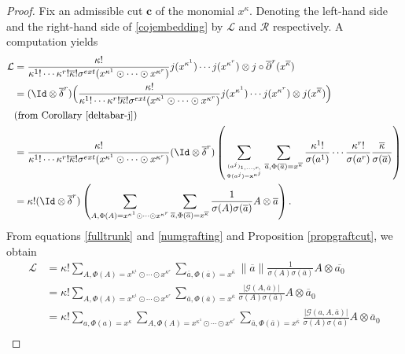 \documentclass[a4paper,11pt]{article}
\begin{document}
\begin{proof}
Fix an admissible cut $\mathbf c$ of the monomial $x^{\kappa}$. Denoting the left-hand side and the right-hand side of \eqref{cojembedding} by $\mathcal L$ and $\mathcal R$ respectively.
A computation yields
\begin{align*}
\mathcal L & = \frac{\kappa!}{\kappa^1!\cdots \kappa^r!\overline{\kappa}!\sigma^{ext}(x^{\kappa^1}\odot \cdots\odot x^{\kappa^r})}j(x^{\kappa^1})\cdots j(x^{\kappa^r})\otimes j\circ \overline{\partial}^r(x^{\overline{\kappa}})\\
& = (\Id \otimes \overline{\delta}^r)\Big(\frac{\kappa!}{\kappa^1!\cdots \kappa^r!\overline{\kappa}!\sigma^{ext}(x^{\kappa^1} \odot \cdots\odot x^{\kappa^r})}j(x^{\kappa^1})\cdots j(x^{\kappa^r})\otimes j(x^{\overline{\kappa}})\Big)  \\
& (\text{from Corollary } \ref{deltabar-j})\\
& = \frac{\kappa!}{\kappa^1!\cdots \kappa^r!\overline{\kappa}!\sigma^{ext}(x^{\kappa^1}\odot\cdots\odot x^{\kappa^r})}(\Id \otimes \overline{\delta}^r)\left(\sum_{ \genfrac{}{}{0pt}{2}{(a^j)_{1,\ldots, r,}}  {\Phi(a^j)=\mathbf x^{\mathbf \kappa^j} }}\sum_{\overline{a}, \Phi(\overline{a})=x^{\overline{\kappa}}}\frac{\kappa^1!}{\sigma(a^1)} \cdots \frac{\kappa^r!}{\sigma(a^r)}\frac{\overline{\kappa}}{\sigma(\overline{a})}\right)\\
& =  \kappa!(\Id \otimes \overline{\delta}^r)\left(\sum_{A, \Phi(A)= x^{\kappa^1}\odot \cdots\odot x^{\kappa^r}}\sum_{\overline{a}, \Phi(\overline{a})=x^{\overline{\kappa}}}\frac{1}{\sigma(A)\sigma(\overline{a})}A\otimes \overline{a}\right).
\end{align*}
From equations \eqref{fulltrunk} and \eqref{numgrafting} and Proposition \ref{propgraftcut}, we obtain 
\begin{align*}
\mathcal L & = \kappa! \sum_{A, \Phi(A)=x^{\kappa^1}\odot \cdots\odot  x^{\kappa^r}}\sum_{\overline{a}, \Phi(\overline{a})=x^{\overline{\kappa}}}\| \overline{a}\|\frac{1}{\sigma(A)\sigma(\overline{a})}A\otimes \overline{a_0}\\
& = \kappa! \sum_{A, \Phi(A)= x^{\kappa^1}\odot \cdots\odot x^{\kappa^r}}\sum_{\overline{a}, \Phi(\overline{a})=x^{\overline{\kappa}}}\frac{\vert\mathcal G(A, \overline{a})\vert}{\sigma(A)\sigma(\overline{a})}A\otimes \overline{a}_0\\
& = \kappa! \sum_{a, \Phi(a)=x^{\kappa}}\sum_{A, \Phi(A)=x^{\kappa^1}\odot \cdots\odot x^{\kappa^r}}\sum_{\overline{a}, \Phi(\overline{a})=x^{\overline{\kappa}}}\frac{\vert \mathcal G(a, A, \overline{a})\vert }{\sigma(A)\sigma(\overline{a})}A\otimes \overline{a}_0\\

\end{align*}
\end{proof}
\end{document}
